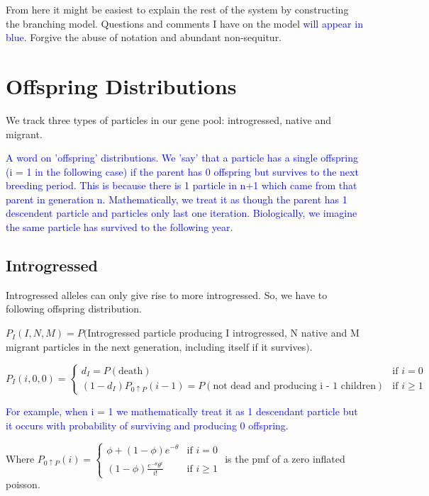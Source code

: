 \documentclass[12pt]{article}
\begin{document}
From here it might be easiest to explain the rest of the system by constructing the branching model. Questions and comments I have on the model \textcolor{blue}{will appear in blue}. Forgive the abuse of notation and abundant non-sequitur.

\section{Offspring Distributions}

We track three types of particles in our gene pool: introgressed, native and migrant.

\textcolor{blue}{A word on 'offspring' distributions. We 'say' that a particle has a single offspring (i = 1 in the following case) if the parent has 0 offspring but survives to the next breeding period. This is because there is 1 particle in n+1 which came from that parent in generation n. Mathematically, we treat it as though the parent has 1 descendent particle and particles only last one iteration. Biologically, we imagine the same particle has survived to the following year.}

\subsection{Introgressed}

Introgressed alleles can only give rise to more introgressed. So, we have to following offspring distribution. 

$P_I(I,N,M) = P($Introgressed particle producing I introgressed, N native  and M migrant particles in the next generation, including itself if it survives$)$.

\begin{equation} 
    P_I(i,0,0) =
  \begin{cases}
    d_I = P(\mbox{death}) & \text{if $i=0$} \\
    (1-d_I)P_{0 \uparrow P}(i-1) = P(\mbox{not dead and producing i - 1 children})  & \text{if $i \geq 1$} 
  \end{cases}
\end{equation}

\textcolor{blue}{For example, when i = 1 we mathematically treat it as 1 descendant particle but it occurs with probability of surviving and producing 0 offspring.}

Where $P_{0 \uparrow P}(i) = 
\begin{cases}
\phi + (1- \phi) e^{-\theta} & \text{if $i =0$} \\
(1 - \phi) \frac{e^{-\theta} \theta^i}{i!} & \text{if $i \geq 1$}
\end{cases}$
is the pmf of a zero inflated poisson.
\end{document}
